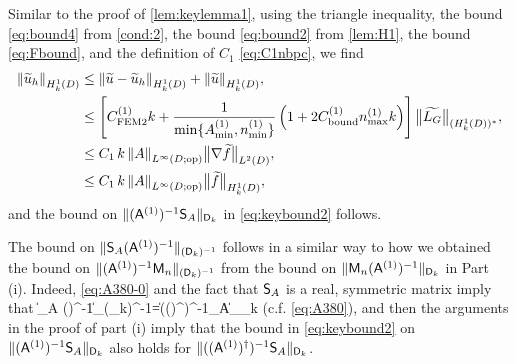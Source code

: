 Similar to the proof of \cref{lem:keylemma1},
using the triangle inequality, the bound \cref{eq:bound4} from \cref{cond:2}, the bound \cref{eq:bound2} from \cref{lem:H1}, the bound \cref{eq:Fbound}, and the definition of $C_1$ \cref{eq:C1nbpc},
we find
\begin{align}\nonumber 
\N{\tu_h}_{\HokD} &\leq
\N{\tu-\tu_h}_{\HokD} + \N{\tu}_{\HokD},\nonumber \\ \nonumber
& \leq \left[ C^{(1)}_{\rm FEM2} k + 
\frac{1}{\min\{\Asomin,\nsomin\}}\left( 1 + 2 C^{(1)}_{\rm bound}\nsomax k  \right) 
\right]\big\|\widetilde{\LG}\big\|_{(\HokD)^*},\\
&\leq C_1 \, k\, 
\NLiDRRdtd{A} \big\|\nabla\widetilde{f}\big\|_{\LtD},\label{eq:mainevent2}\\
&\leq C_1 \, k\, 
\NLiDRRdtd{A} \big\|\widetilde{f}\big\|_{\HokD},\nonumber
\end{align}
and the bound on $\|(\mathsf{A}^{(1)})^{-1}\mathsf{S}_A\|_{\mathsf{D}_k}$ in \cref{eq:keybound2} follows.

The bound on $\|\mathsf{S}_A(\mathsf{A}^{(1)})^{-1}\|_{(\mathsf{D}_k)^{-1}}$ follows in a similar way to how we obtained the 
bound on  $\|(\mathsf{A}^{(1)})^{-1}\mathsf{M}_n\|_{(\mathsf{D}_k)^{-1}}$ from the bound on $\|\mathsf{M}_n(\mathsf{A}^{(1)})^{-1}\|_{\mathsf{D}_k}$ in Part (i). Indeed, 
\cref{eq:A380-0} and the fact that $\mathsf{S}_A$ is a real, symmetric matrix imply that 
\beq\label{eq:A380-2} 
 \big\|\Smat_A (\Amato)^{-1}\big\|_{(\Dmat_k)^{-1}}=\big\|\big((\Amato)^\dagger\big)^{-1}\Smat_A\big\|_{\Dmat_k}
 \eeq 
(c.f. \cref{eq:A380}),
and then the arguments in the proof of part (i) imply that 
the bound in \cref{eq:keybound2} on $\|(\mathsf{A}^{(1)})^{-1}\mathsf{S}_A\|_{\mathsf{D}_k}$ also holds for $\|((\mathsf{A}^{(1)})^\dagger)^{-1}\mathsf{S}_A\|_{\mathsf{D}_k}$.

